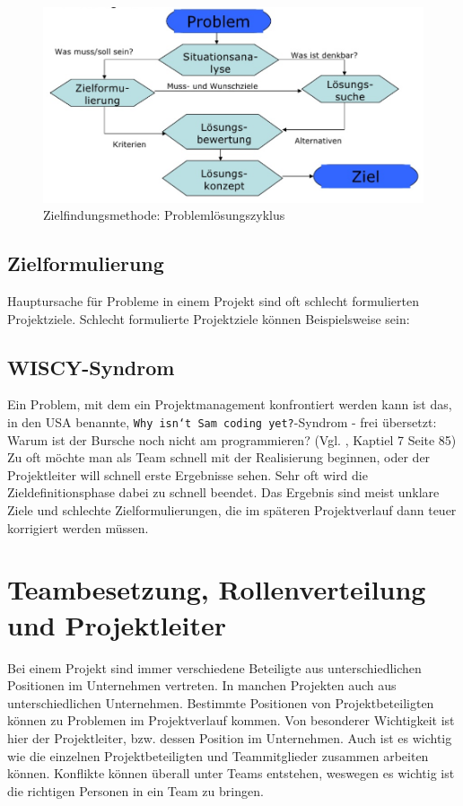\documentclass[12pt]{scrartcl}
\begin{document}
\begin{figure}[H]
	\begin{center}
		\includegraphics[width=1.0\textwidth]{img/problemloesungszyklus}
		\caption{Zielfindungsmethode: Problemlösungszyklus}
		\label{probsolcycle}	
	\end{center}
\end{figure}

\subsection{Zielformulierung}
Hauptursache für Probleme in einem Projekt sind oft schlecht formulierten Projektziele. Schlecht formulierte Projektziele können Beispielsweise sein:



\subsection{WISCY-Syndrom}
Ein Problem, mit dem ein Projektmanagement konfrontiert werden kann ist das, in den USA benannte, \texttt{Why isn`t Sam coding yet?}-Syndrom - frei übersetzt: Warum ist der Bursche noch nicht am programmieren? (Vgl. \cite{proj_zum_erfolg_fuehren}, Kaptiel 7 Seite 85) \\
Zu oft möchte man als Team schnell mit der Realisierung beginnen, oder der Projektleiter will schnell erste Ergebnisse sehen. Sehr oft wird die Zieldefinitionsphase dabei zu schnell beendet. Das Ergebnis sind meist unklare Ziele und schlechte Zielformulierungen, die im späteren Projektverlauf dann teuer korrigiert werden müssen.

\pagebreak
\section{Teambesetzung, Rollenverteilung und Projektleiter}
Bei einem Projekt sind immer verschiedene Beteiligte aus unterschiedlichen Positionen im Unternehmen vertreten. In manchen Projekten auch aus unterschiedlichen Unternehmen. Bestimmte Positionen von Projektbeteiligten können zu Problemen im Projektverlauf kommen. Von besonderer Wichtigkeit ist hier der Projektleiter, bzw. dessen Position im Unternehmen. Auch ist es wichtig wie die einzelnen Projektbeteiligten und Teammitglieder zusammen arbeiten können. Konflikte können überall unter Teams entstehen, weswegen es wichtig ist die richtigen Personen in ein Team zu bringen. 
\end{document}

